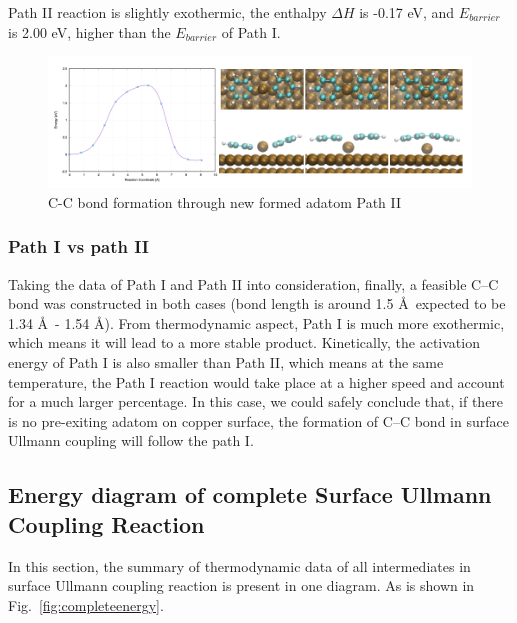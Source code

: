 \documentclass[%
 reprint,
 amsmath,amssymb,
 aps,
prb,
]{revtex4-1}
\begin{document}
Path II reaction is slightly exothermic, the enthalpy $\Delta H$ is -0.17 eV, and $E_{barrier}$ is 2.00 eV, higher than the $E_{barrier}$ of Path I.

\begin{figure}[hbt]
\centering
\includegraphics[width=1.0\textwidth]{Fig/bondformadatom.png}
\caption{C-C bond formation through new formed adatom Path II}
\label{fig:bondformadatom}
\end{figure}

\subsubsection{Path I vs path II}

Taking the data of Path I and Path II into consideration, finally, a feasible C--C bond was constructed in both cases (bond length is around 1.5 \AA\, expected to be 1.34 \AA\ - 1.54 \AA). From thermodynamic aspect, Path I is much more exothermic, which means it will lead to a more stable product. Kinetically, the activation energy of Path I is also smaller than Path II, which means at the same temperature, the Path I reaction would take place at a higher speed and account for a much larger percentage. In this case, we could safely conclude that, if there is no pre-exiting adatom on copper surface, the formation of C--C bond in surface Ullmann coupling will follow the path I.





\subsection{Energy diagram of complete Surface Ullmann Coupling Reaction}
In this section, the summary of thermodynamic data of all intermediates in surface Ullmann coupling reaction is present in one diagram. As is shown in Fig.~\ref{fig:completeenergy}.
\end{document}
